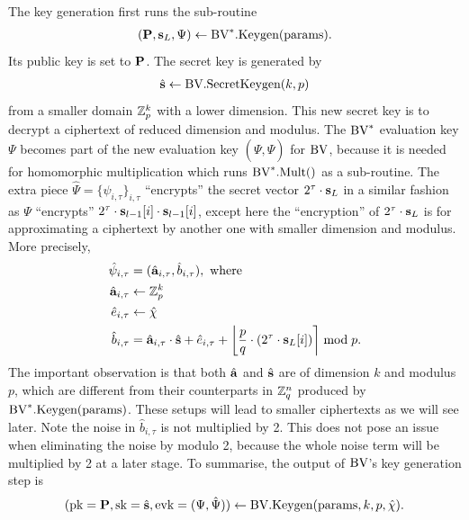 \documentclass[../main.tex]{subfiles}
\begin{document}
The key generation first runs the sub-routine 
\begin{align*}
    (\mathbf{P}, \mathbf{s}_L, \Psi) \leftarrow \text{BV}^*.\text{Keygen}(\text{params}).
\end{align*}
Its public key is set to $\mathbf{P}$. 
The secret key is generated by
\begin{align*}
    \hat{\vc{s}} \leftarrow \bv.\seckeygen(k,p) %
\end{align*}
from a smaller domain $\mathbb{Z}_p^k$ with a lower dimension. This new secret key is to decrypt a ciphertext of reduced dimension and modulus. The $\text{BV}^*$ evaluation key $\Psi$ becomes part of the new evaluation key $(\Psi, \hat{\Psi})$ for $\text{BV}$, because it is needed for homomorphic multiplication which runs $\text{BV}^*.\text{Mult}()$ as a sub-routine. The extra piece $\hat{\Psi}=\{\hat{\psi}_{i,\tau}\}_{i,\tau}$ ``encrypts'' the secret vector $2^{\tau} \cdot \mathbf{s}_L$ in a similar fashion as $\Psi$ ``encrypts'' $2^{\tau} \cdot \mathbf{s}_{l-1}[i] \cdot \mathbf{s}_{l-1}[i]$, %
except here the ``encryption'' of $2^{\tau} \cdot \mathbf{s}_L$ is for approximating a ciphertext by another one with smaller dimension and modulus. More precisely, %
\begin{align*}
    \hat{\psi}_{i,\tau} &= (\hat{\mathbf{a}}_{i,\tau},\hat{b}_{i,\tau}), \text{ where} \\
    \hat{\mathbf{a}}_{i,\tau} &\leftarrow \mathbb{Z}_p^k \\
    \hat{e}_{i,\tau} &\leftarrow \hat{\chi} \\
    \hat{b}_{i,\tau} &= \hat{\mathbf{a}}_{i,\tau} \cdot \hat{\mathbf{s}}+\hat{e}_{i,\tau}+\left\lfloor{\frac{p}{q} \cdot (2^{\tau} \cdot \mathbf{s}_L[i])}\right\rceil \bmod p.
\end{align*}
The important observation is that both $\hat{\mathbf{a}}$ and $\hat{\mathbf{s}}$ are of dimension $k$ and modulus $p$, which are different from their counterparts in $\mathbb{Z}_q^n$ produced by $\text{BV}^*.\text{Keygen}(\text{params})$. These setups will lead to smaller ciphertexts as we will see later. Note the noise in $\hat{b}_{i,\tau}$ is not multiplied by 2. This does not pose an issue when eliminating the noise by modulo 2, because the whole noise term will be multiplied by 2 at a later stage. To summarise, the output of $\text{BV}$'s key generation step is  
\begin{align*}
    (\text{pk}=\mathbf{P}, \text{sk}=\hat{\mathbf{s}}, \text{evk}=(\Psi,\hat{\Psi})) \leftarrow \text{BV}.\text{Keygen}(\text{params},k,p,\hat{\chi}).
\end{align*}
\end{document}
